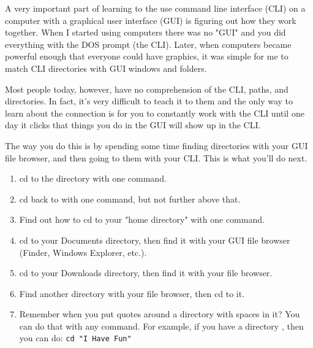 A very important part of learning to the use command line interface (CLI) on a computer with a
graphical user interface (GUI) is figuring out how they work together.  When I started using
computers there was no "GUI" and you did everything with the DOS prompt (the CLI).  Later, when
computers became powerful enough that everyone could have graphics, it was simple for me
to match CLI directories with GUI windows and folders.

Most people today, however, have no comprehension of the CLI, paths, and directories.
In fact, it's very difficult to teach it to them and the only way to learn about the
connection is for you to constantly work with the CLI until one day it clicks that 
things you do in the GUI will show up in the CLI.

The way you do this is by spending some time finding directories with your GUI file browser, 
and then going to them with your CLI.  This is what you'll do next.

\begin{enumerate}
\item cd to the  directory with one command.
\item cd back to  with one command, but not further above that.
\item Find out how to cd to your "home directory" with one command.
\item cd to your Documents directory, then find it with your GUI file browser (Finder, Windows Explorer, etc.).
\item cd to your Downloads directory, then find it with your file browser.
\item Find another directory with your file browser, then cd to it.
\item Remember when you put quotes around a directory with spaces in it?  You 
can do that with any command. For example, if you have a directory , then you can do:  \verb|cd "I Have Fun"|
\end{enumerate}

